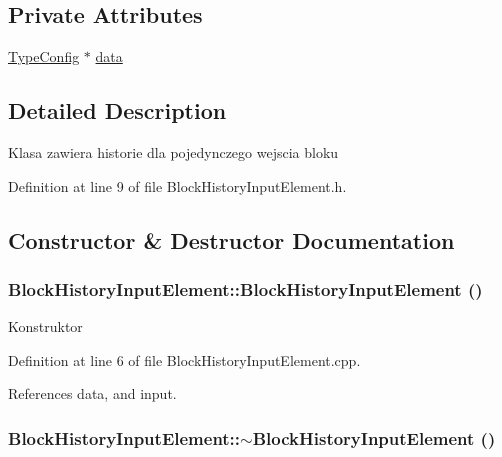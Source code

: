 \subsection*{Private Attributes}
\begin{CompactItemize}
\item 
\hyperlink{classTypeConfig}{TypeConfig} $\ast$ \hyperlink{classBlockHistoryInputElement_e8c6facba5335a07f2452279191cd6e8}{data}
\end{CompactItemize}


\subsection{Detailed Description}
Klasa zawiera historie dla pojedynczego wejscia bloku 

Definition at line 9 of file BlockHistoryInputElement.h.

\subsection{Constructor \& Destructor Documentation}
\hypertarget{classBlockHistoryInputElement_40ce1d8e1e4f6e7654e31e7dff51bb42}{
\subsubsection[BlockHistoryInputElement]{\setlength{\rightskip}{0pt plus 5cm}BlockHistoryInputElement::BlockHistoryInputElement ()}}
\label{classBlockHistoryInputElement_40ce1d8e1e4f6e7654e31e7dff51bb42}


Konstruktor 

Definition at line 6 of file BlockHistoryInputElement.cpp.

References data, and input.\hypertarget{classBlockHistoryInputElement_122c02aac40c5b3e7ff7935e68f36469}{
\subsubsection[$\sim$BlockHistoryInputElement]{\setlength{\rightskip}{0pt plus 5cm}BlockHistoryInputElement::$\sim$BlockHistoryInputElement ()}}
\label{classBlockHistoryInputElement_122c02aac40c5b3e7ff7935e68f36469}


